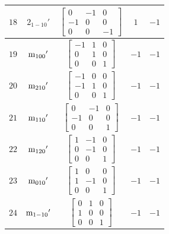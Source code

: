 \documentclass[fleqn,8pt]{jsarticle}
\begin{document}
\begin{longtable}{ccccc}
$ 18 $ & $ 2{}_{1-10}{}' $ & $ \begin{bmatrix} 0 & -1 & 0 \\ -1 & 0 & 0 \\ 0 & 0 & -1 \end{bmatrix} $ & $ 1 $ & $ -1 $ \\ \hline
$ 19 $ & $ {\rm m}_{100}{}' $ & $ \begin{bmatrix} -1 & 1 & 0 \\ 0 & 1 & 0 \\ 0 & 0 & 1 \end{bmatrix} $ & $ -1 $ & $ -1 $ \\ \hline
$ 20 $ & $ {\rm m}_{210}{}' $ & $ \begin{bmatrix} -1 & 0 & 0 \\ -1 & 1 & 0 \\ 0 & 0 & 1 \end{bmatrix} $ & $ -1 $ & $ -1 $ \\ \hline
$ 21 $ & $ {\rm m}_{110}{}' $ & $ \begin{bmatrix} 0 & -1 & 0 \\ -1 & 0 & 0 \\ 0 & 0 & 1 \end{bmatrix} $ & $ -1 $ & $ -1 $ \\ \hline
$ 22 $ & $ {\rm m}_{120}{}' $ & $ \begin{bmatrix} 1 & -1 & 0 \\ 0 & -1 & 0 \\ 0 & 0 & 1 \end{bmatrix} $ & $ -1 $ & $ -1 $ \\ \hline
$ 23 $ & $ {\rm m}_{010}{}' $ & $ \begin{bmatrix} 1 & 0 & 0 \\ 1 & -1 & 0 \\ 0 & 0 & 1 \end{bmatrix} $ & $ -1 $ & $ -1 $ \\ \hline
$ 24 $ & $ {\rm m}_{1-10}{}' $ & $ \begin{bmatrix} 0 & 1 & 0 \\ 1 & 0 & 0 \\ 0 & 0 & 1 \end{bmatrix} $ & $ -1 $ & $ -1 $ \\
\end{longtable}
\end{document}
